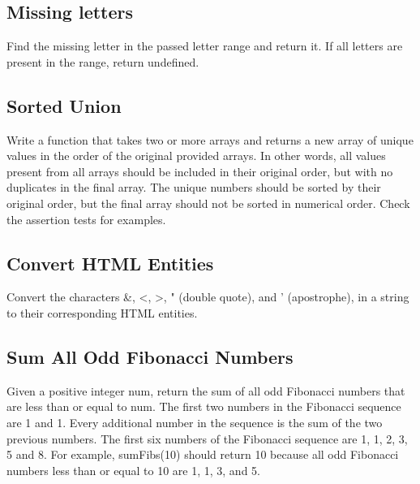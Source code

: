\documentclass{article}%
\begin{document}
%
\subsection{Missing letters}%
\label{subsec:Missingletters}%
Find the missing letter in the passed letter range and return it.\newline%
If all letters are present in the range, return undefined.\newline%

%
\subsection{Sorted Union}%
\label{subsec:SortedUnion}%
Write a function that takes two or more arrays and returns a new array of unique values in the order of the original provided arrays.\newline%
In other words, all values present from all arrays should be included in their original order, but with no duplicates in the final array.\newline%
The unique numbers should be sorted by their original order, but the final array should not be sorted in numerical order.\newline%
Check the assertion tests for examples.\newline%

%
\subsection{Convert HTML Entities}%
\label{subsec:ConvertHTMLEntities}%
Convert the characters \&, <, >, " (double quote), and ' (apostrophe), in a string to their corresponding HTML entities.\newline%

%
\subsection{Sum All Odd Fibonacci Numbers}%
\label{subsec:SumAllOddFibonacciNumbers}%
Given a positive integer num, return the sum of all odd Fibonacci numbers that are less than or equal to num.\newline%
The first two numbers in the Fibonacci sequence are 1 and 1. Every additional number in the sequence is the sum of the two previous numbers. The first six numbers of the Fibonacci sequence are 1, 1, 2, 3, 5 and 8.\newline%
For example, sumFibs(10) should return 10 because all odd Fibonacci numbers less than or equal to 10 are 1, 1, 3, and 5.\newline%
\end{document}
